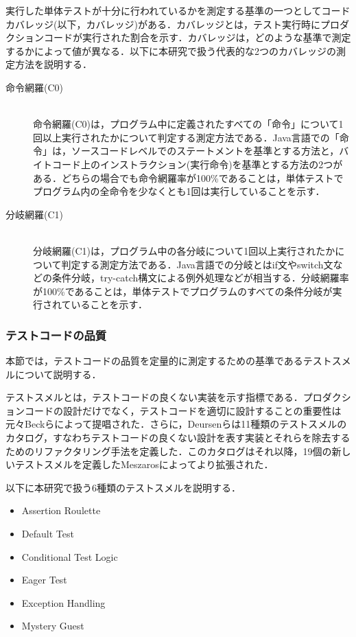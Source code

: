 \documentclass[12pt]{jarticle} %
\begin{document}
実行した単体テストが十分に行われているかを測定する基準の一つとしてコードカバレッジ(以下，カバレッジ)がある．カバレッジとは，テスト実行時にプロダクションコードが実行された割合を示す．カバレッジは，どのような基準で測定するかによって値が異なる．以下に本研究で扱う代表的な2つのカバレッジの測定方法を説明する．

\begin{description}
\item[命令網羅(C0)]~\\
命令網羅(C0)は，プログラム中に定義されたすべての「命令」について1回以上実行されたかについて判定する測定方法である．Java言語での「命令」は，ソースコードレベルでのステートメントを基準とする方法と，バイトコード上のインストラクション(実行命令)を基準とする方法の2つがある．どちらの場合でも命令網羅率が100\%であることは，単体テストでプログラム内の全命令を少なくとも1回は実行していることを示す．
\item[分岐網羅(C1)]~\\
分岐網羅(C1)は，プログラム中の各分岐について1回以上実行されたかについて判定する測定方法である．Java言語での分岐とはif文やswitch文などの条件分岐，try-catch構文による例外処理などが相当する．分岐網羅率が100\%であることは，単体テストでプログラムのすべての条件分岐が実行されていることを示す．
\end{description}




\subsubsection{テストコードの品質}

本節では，テストコードの品質を定量的に測定するための基準であるテストスメルについて説明する．

テストスメルとは，テストコードの良くない実装を示す指標である．プロダクションコードの設計だけでなく，テストコードを適切に設計することの重要性は元々Beckら\cite{h1}によって提唱された．さらに，Deursenら\cite{t1}は11種類のテストスメルのカタログ，すなわちテストコードの良くない設計を表す実装とそれらを除去するためのリファクタリング手法を定義した．このカタログはそれ以降，19個の新しいテストスメルを定義したMeszaros\cite{b6}によってより拡張された．

以下に本研究で扱う6種類のテストスメルを説明する．

\begin{itemize}
\item Assertion Roulette
\item Default Test
\item Conditional Test Logic
\item Eager Test
\item Exception Handling
\item Mystery Guest
\end{itemize}
\end{document}
